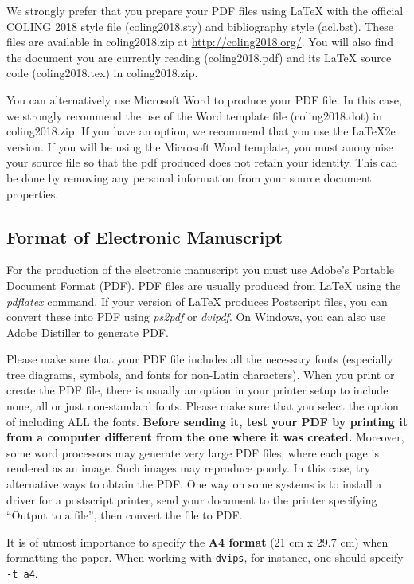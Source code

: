 \documentclass[11pt]{article}
\begin{document}
We strongly prefer that you prepare your PDF files using \LaTeX{} with
the official COLING 2018 style file (coling2018.sty) and bibliography style
(acl.bst). These files are available in coling2018.zip 
at \url{http://coling2018.org/}.
You will also find the document
you are currently reading (coling2018.pdf) and its \LaTeX{} source code
(coling2018.tex) in coling2018.zip. 

You can alternatively use Microsoft Word to produce your PDF file. In
this case, we strongly recommend the use of the Word template file
(coling2018.dot) in coling2018.zip. If you have an option, we
recommend that you use the \LaTeX2e{} version. If you will be
  using the Microsoft Word template, you must anonymise
  your source file so that the pdf produced does not retain your
  identity.  This can be done by removing any personal information
from your source document properties.



\subsection{Format of Electronic Manuscript}
\label{sect:pdf}

For the production of the electronic manuscript you must use Adobe's
Portable Document Format (PDF). PDF files are usually produced from
\LaTeX{} using the \textit{pdflatex} command. If your version of
\LaTeX{} produces Postscript files, you can convert these into PDF
using \textit{ps2pdf} or \textit{dvipdf}. On Windows, you can also use
Adobe Distiller to generate PDF.

Please make sure that your PDF file includes all the necessary fonts
(especially tree diagrams, symbols, and fonts for non-Latin characters). 
When you print or create the PDF file, there is usually
an option in your printer setup to include none, all or just
non-standard fonts.  Please make sure that you select the option of
including ALL the fonts. \textbf{Before sending it, test your PDF by
  printing it from a computer different from the one where it was
  created.} Moreover, some word processors may generate very large PDF
files, where each page is rendered as an image. Such images may
reproduce poorly. In this case, try alternative ways to obtain the
PDF. One way on some systems is to install a driver for a postscript
printer, send your document to the printer specifying ``Output to a
file'', then convert the file to PDF.

It is of utmost importance to specify the \textbf{A4 format} (21 cm
x 29.7 cm) when formatting the paper. When working with
{\tt dvips}, for instance, one should specify {\tt -t a4}.
\end{document}
